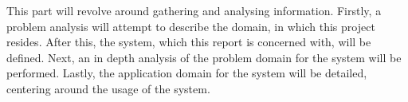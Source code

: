 This part will revolve around gathering and analysing information.
Firstly, a problem analysis will attempt to describe the domain, in which this project resides.
After this, the system, which this report is concerned with, will be defined.
Next, an in depth analysis of the problem domain for the system will be performed.
Lastly, the application domain for the system will be detailed, centering around the usage of the system.
